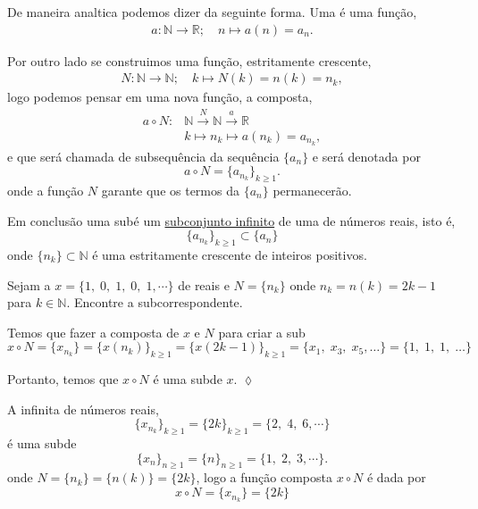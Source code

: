 De maneira anal\ii tica podemos dizer da seguinte forma. Uma \seq \'{e} uma fun\c{c}\~{a}o,
\begin{align*}
    a\colon \mathbb{N}\to\mathbb{R};\quad n\mapsto a(n)=a_n.
\end{align*}

Por outro lado se construimos uma fun\c{c}\~{a}o, estritamente crescente,
\begin{align*}
    N\colon \mathbb{N}\to\mathbb{N};\quad k\mapsto N(k)=n(k)=n_k,
\end{align*}
logo podemos pensar em uma nova fun\c{c}\~{a}o, a composta,
\begin{align*}
a\circ N\colon &\mathbb{N}\overset{N}{\longrightarrow}\mathbb{N}\overset{a}{\longrightarrow} \mathbb{R}\\
            &k\mapsto n_k\mapsto a(n_k)=a_{n_k},
\end{align*}
e que ser\'{a} chamada de subsequ\^{e}ncia da sequ\^{e}ncia $\{a_n\}$ e ser\'{a}
denotada por
$$
a\circ N=\{a_{n_{k}}\}_{k\geq 1}.
$$
onde a fun\c{c}\~{a}o $N$ garante que os termos da \seq $\{a_n\}$ permanecer\~{a}o.

Em conclus\~{a}o uma sub\seq \'{e} um \underline{subconjunto infinito} de
uma \seq de n\'{u}meros reais, isto \'{e},
\begin{equation*}
    \{a_{n_{k}}\}_{k\geq 1}\subset \{a_n\}
\end{equation*}
onde $\{n_k\}\subset \mathbb{N}$ \'{e} uma \seq estritamente crescente
de inteiros positivos.

\begin{exer}
Sejam a \seqs  $x=\{1,\; 0,\; 1,\;0,\; 1,\cdots \}$ de reais e  $N=\{n_{k}\}$ onde $n_k=n(k)=2k-1$ para $k\in \mathbb{N}$. Encontre a sub\seq correspondente.
\end{exer}

\solo Temos que fazer a composta de $x$ e $N$ para criar a sub\seq
\begin{equation*}
    x\circ N=\{x_{n_k}\}=\{x(n_k)\}_{k\geq 1}=\{x(2k-1)\}_{k\geq 1}=\{x_1,\;x_3,\; x_5,\ldots \}=\{1,\;1,\;1,\;\ldots \}
\end{equation*}

Portanto, temos que $x\circ N$ \'{e} uma sub\seq de $x$. \hfill \(\lozenge\)

\begin{exer}
A \seq infinita de n\'{u}meros reais,
$$
\{x_{n_{k}}\}_{k\geq 1}=\{2k\}_{k\geq 1}=\{2,\; 4, \; 6,\cdots \}
$$
\'e uma sub\seq de
$$
\{x_n\}_{n\geq 1}=\{n\}_{n\geq 1}=\{1,\; 2,\; 3,\cdots\}.
$$
onde $N=\{n_k\}=\{n(k)\}=\{2k\}$, logo a fun\c{c}\~{a}o composta $x\circ N$ \'{e} dada por
\begin{equation*}
    x\circ N=\{x_{n_k}\}=\{2k\}
\end{equation*}

\end{exer}

